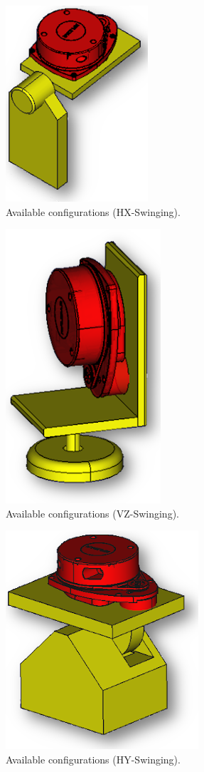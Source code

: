 \documentclass[Afour,sageh,times]{sagej}
\begin{document}
\begin{figure}
    \centering
    \includegraphics[scale=25]{model1.png}
    \caption{Available configurations (HX-Swinging).}
    \label{fig:Model1-HX-Swinging}
\end{figure}
\begin{figure}
    \centering
    \includegraphics[scale=1.5]{model2.png}
    \caption{Available configurations (VZ-Swinging).}
    \label{fig:Model2-VZ-Swinging}
\end{figure}
\begin{figure}
    \centering
    \includegraphics[scale=1.5]{model3.png}
    \caption{Available configurations (HY-Swinging).}
    \label{fig:Model3-HY-Swinging}
\end{figure}
\end{document}
